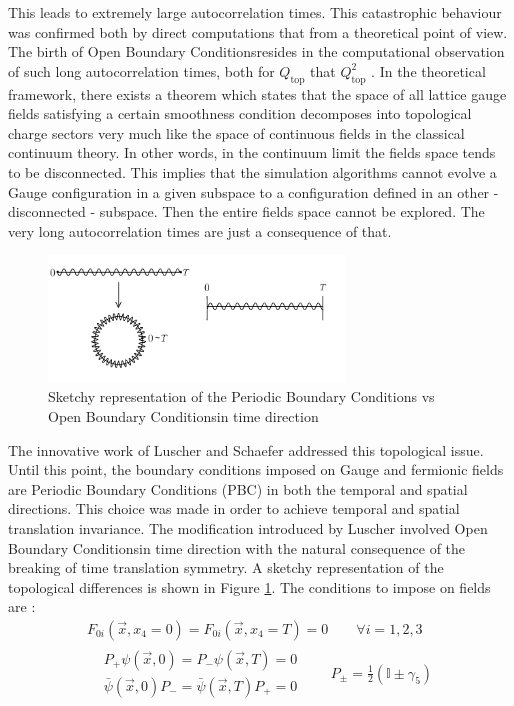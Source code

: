 \documentclass[english, LaM, oneside, noexaminfo]{sapthesis}
\newcommand{\obc}{Open Boundary Conditions}
\begin{document}
This leads to extremely large autocorrelation times.
\newline
This catastrophic behaviour was confirmed both by direct computations that from a theoretical point of view.
The birth of \obc\space resides in the computational observation of such long autocorrelation times, both for $Q_\text{top}$ \cite{investigatin-critical-slowing-down} that $Q_\text{top}^2$ \cite{critical-slowing-down-error-analysis}. 
In the theoretical framework, there exists a theorem \cite{Topology-WilsonFlow-HMC} which states that the space of all lattice gauge fields satisfying a certain smoothness condition decomposes into topological charge sectors very much like the space of continuous fields in the classical continuum theory.
In other words, in the continuum limit the fields space tends to be disconnected.
This implies that the simulation algorithms cannot evolve a Gauge configuration in a given subspace to a configuration defined in an other - disconnected - subspace.
Then the entire fields space cannot be explored. 
The very long autocorrelation times are just a consequence of that.
\begin{figure}[h!]
    \centering
    \includegraphics[width=0.7\textwidth]{imgs-MSc-thesis/torus-obc.png}
    \caption{Sketchy representation of the Periodic Boundary Conditions vs \obc\space in time direction}
    \label{fig:torus}
\end{figure}
\newline
The innovative work of Luscher and Schaefer addressed this topological issue.
Until this point, the boundary conditions imposed on Gauge and fermionic fields are Periodic Boundary Conditions (PBC) in both the temporal and spatial directions.
This choice was made in order to achieve temporal and spatial translation invariance.
The modification introduced by Luscher involved \obc\space in time direction with the natural consequence of the breaking of time translation symmetry.
A sketchy representation of the topological differences is shown in Figure \ref{fig:torus}.
The conditions to impose on fields are \cite{OBC_top}:
\begin{equation*}
    \begin{gathered}
        F_{0i}(\vec x, x_4=0) = F_{0i}(\vec x, x_4=T) = 0 \qquad \forall i = 1,2,3 \\
        \begin{aligned}
            & P_+ \psi (\vec x, 0) = P_- \psi (\vec x, T) = 0 \\
            & \bar\psi (\vec x, 0) P_- = \bar\psi (\vec x, T) P_+ = 0 
        \end{aligned}
        \quad\quad P_{\pm} = \frac{1}{2}\left(\mathbb{I} \pm \gamma_5 \right)
    \end{gathered}
\end{equation*}
\end{document}
